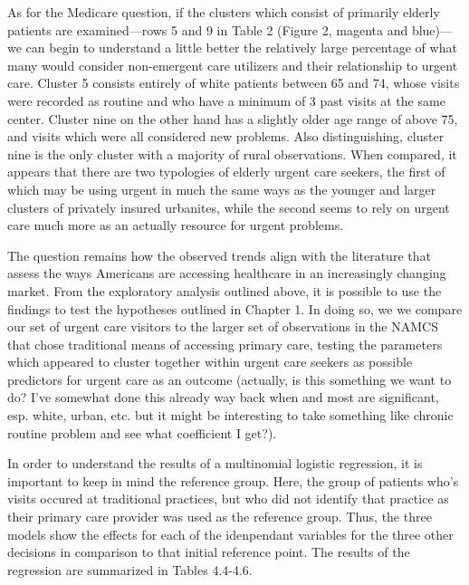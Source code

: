\documentclass[12pt,twoside]{reedthesis}
\begin{document}
  As for the Medicare question, if the clusters which consist of primarily
  elderly patients are examined---rows 5 and 9 in Table 2 (Figure 2,
  magenta and blue)---we can begin to understand a little better the
  relatively large percentage of what many would consider non-emergent
  care utilizers and their relationship to urgent care. Cluster 5 consists
  entirely of white patients between 65 and 74, whose visits were recorded
  as routine and who have a minimum of 3 past visits at the same center.
  Cluster nine on the other hand has a slightly older age range of above
  75, and visits which were all considered new problems. Also
  distinguishing, cluster nine is the only cluster with a majority of
  rural observations. When compared, it appears that there are two
  typologies of elderly urgent care seekers, the first of which may be
  using urgent in much the same ways as the younger and larger clusters of
  privately insured urbanites, while the second seems to rely on urgent
  care much more as an actually resource for urgent problems.
  
  The question remains how the observed trends align with the literature
  that assess the ways Americans are accessing healthcare in an
  increasingly changing market. From the exploratory analysis outlined
  above, it is possible to use the findings to test the hypotheses
  outlined in Chapter 1. In doing so, we we compare our set of urgent care
  visitors to the larger set of observations in the NAMCS that chose
  traditional means of accessing primary care, testing the parameters
  which appeared to cluster together within urgent care seekers as
  possible predictors for urgent care as an outcome (actually, is this
  something we want to do? I've somewhat done this already way back when
  and most are significant, esp. white, urban, etc. but it might be
  interesting to take something like chronic routine problem and see what
  coefficient I get?).
  
  In order to understand the results of a multinomial logistic regression,
  it is important to keep in mind the reference group. Here, the group of
  patients who's visits occured at traditional practices, but who did not
  identify that practice as their primary care provider was used as the
  reference group. Thus, the three models show the effects for each of the
  idenpendant variables for the three other decisions in comparison to
  that initial reference point. The results of the regression are
  summarized in Tables 4.4-4.6.
  
\end{document}
